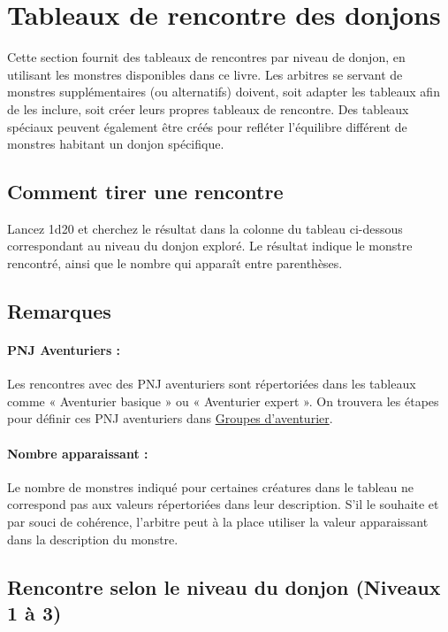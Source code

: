 \section*{Tableaux de rencontre des donjons}\label{tableaux-de-rencontre-des-donjons}

Cette section fournit des tableaux de rencontres par niveau de donjon,
en utilisant les monstres disponibles dans ce livre. Les arbitres se
servant de monstres supplémentaires (ou alternatifs) doivent, soit
adapter les tableaux afin de les inclure, soit créer leurs propres
tableaux de rencontre. Des tableaux spéciaux peuvent également être
créés pour refléter l'équilibre différent de monstres habitant un donjon
spécifique.

\subsection*{Comment tirer une rencontre}\label{comment-tirer-une-rencontre}

Lancez 1d20 et cherchez le résultat dans la colonne du tableau
ci-dessous correspondant au niveau du donjon exploré. Le résultat
indique le monstre rencontré, ainsi que le nombre qui apparaît entre
parenthèses.

\subsection*{Remarques}\label{remarques}

\paragraph{PNJ Aventuriers :} Les rencontres avec des PNJ aventuriers sont
répertoriées dans les tableaux comme « Aventurier basique » ou «
Aventurier expert ». On trouvera les étapes pour définir ces PNJ
aventuriers dans \href{Groupe_d’aventuriers.md}{Groupes d'aventurier}.

\paragraph{Nombre apparaissant :} Le nombre de monstres indiqué pour
certaines créatures dans le tableau ne correspond pas aux valeurs
répertoriées dans leur description. S'il le souhaite et par souci de
cohérence, l'arbitre peut à la place utiliser la valeur apparaissant
dans la description du monstre.

\subsection*{Rencontre selon le niveau du donjon (Niveaux 1 à 3)}\label{rencontre-selon-le-niveau-du-donjon-niveaux-1-uxe0-3}

